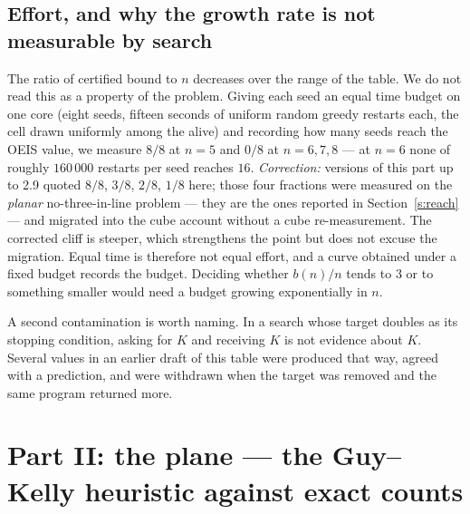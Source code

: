 \documentclass[11pt,a4paper]{article}
\begin{document}
\subsection{Effort, and why the growth rate is not measurable by search}\label{s:effort}
The ratio of certified bound to $n$ decreases over the range of the table.  We do not read this
as a property of the problem.  Giving each seed an equal time budget on one core (eight seeds, fifteen seconds of uniform random
greedy restarts each, the cell drawn uniformly among the alive) and recording how many seeds reach
the OEIS value, we measure $8/8$ at $n=5$ and $0/8$ at $n=6,7,8$ --- at $n=6$ none of roughly
$160\,000$ restarts per seed reaches $16$.  \emph{Correction:} versions of this part up to 2.9 quoted
$8/8$, $3/8$, $2/8$, $1/8$ here; those four fractions were measured on the \emph{planar}
no-three-in-line problem --- they are the ones reported in Section~\ref{s:reach} --- and migrated into the cube account without a cube re-measurement.  The corrected
cliff is steeper, which strengthens the point but does not excuse the migration.
Equal time is therefore not equal effort, and a curve obtained under a fixed budget records the
budget.  Deciding whether $b(n)/n$ tends to $3$ or to something smaller would need a budget
growing exponentially in $n$.

A second contamination is worth naming.  In a search whose target doubles as its stopping
condition, asking for $K$ and receiving $K$ is not evidence about $K$.  Several values in an
earlier draft of this table were produced that way, agreed with a prediction, and were withdrawn
when the target was removed and the same program returned more.

\section{Part II: the plane --- the Guy--Kelly heuristic against exact counts}\label{s:kelly}
\end{document}
